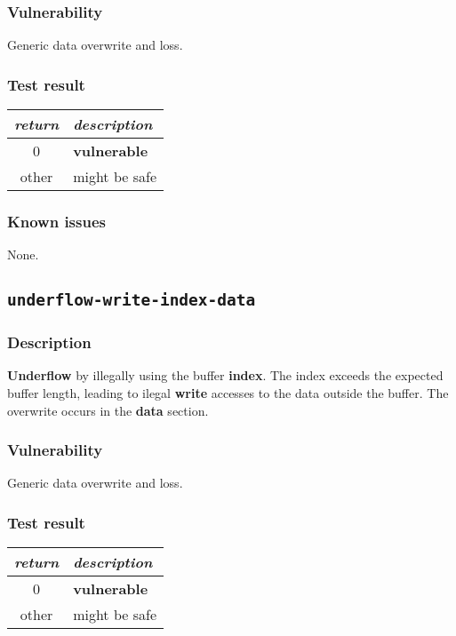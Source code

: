 \documentclass[a4paper]{book}
\begin{document}
\subsubsection{Vulnerability}
Generic data overwrite and loss.

\subsubsection{Test result}

\begin{tabular}{cl}
  \toprule
  \emph{return}  & \emph{description} \\
  \midrule
  0              & \textbf{vulnerable} \\
  other          & might be safe \\
  \bottomrule
\end{tabular}

\subsubsection{Known issues}

None.

\newpage

\subsection{\texttt{underflow-write-index-data}}\label{test-underflow-write-index-data}

\subsubsection{Description}

\textbf{Underflow} by illegally using the buffer \textbf{index}.
The index exceeds the expected buffer length,
leading to ilegal \textbf{write} accesses to the data outside the buffer.
The overwrite occurs in the \textbf{data} section.

\subsubsection{Vulnerability}
Generic data overwrite and loss.

\subsubsection{Test result}

\begin{tabular}{cl}
  \toprule
  \emph{return}  & \emph{description} \\
  \midrule
  0              & \textbf{vulnerable} \\
  other          & might be safe \\
  \bottomrule
\end{tabular}
\end{document}
